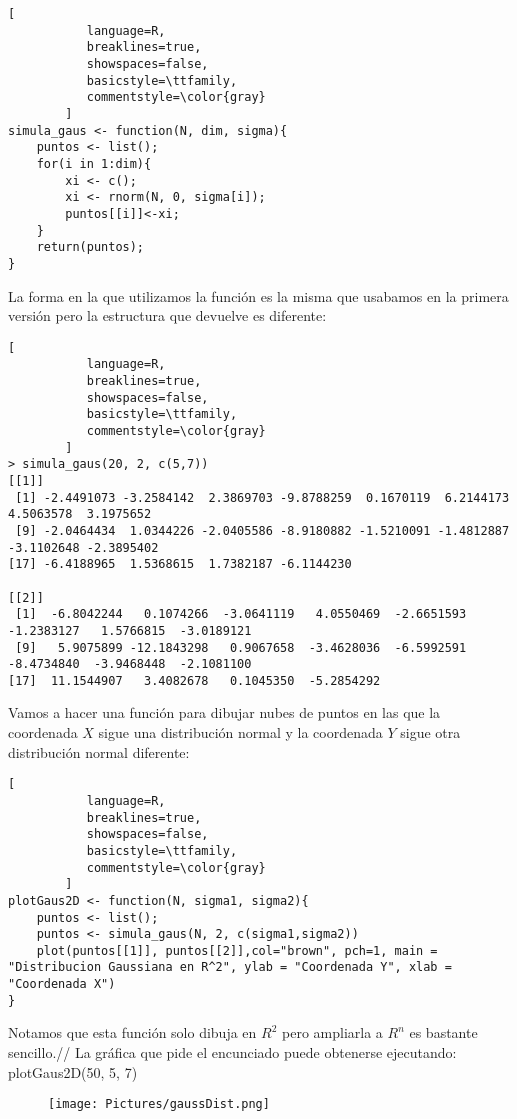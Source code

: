 \documentclass[11pt,fleqn]{book} %
\begin{document}
\begin{lstlisting}[
           language=R,
           breaklines=true,
           showspaces=false,
           basicstyle=\ttfamily,
           commentstyle=\color{gray}
        ]
simula_gaus <- function(N, dim, sigma){
    puntos <- list();
    for(i in 1:dim){
        xi <- c();
        xi <- rnorm(N, 0, sigma[i]);
        puntos[[i]]<-xi;
    }
    return(puntos);
}
\end{lstlisting}
La forma en la que utilizamos la función es la misma que usabamos en la primera versión pero la estructura que devuelve es diferente:
\begin{lstlisting}[
           language=R,
           breaklines=true,
           showspaces=false,
           basicstyle=\ttfamily,
           commentstyle=\color{gray}
        ]
> simula_gaus(20, 2, c(5,7))
[[1]]
 [1] -2.4491073 -3.2584142  2.3869703 -9.8788259  0.1670119  6.2144173  4.5063578  3.1975652
 [9] -2.0464434  1.0344226 -2.0405586 -8.9180882 -1.5210091 -1.4812887 -3.1102648 -2.3895402
[17] -6.4188965  1.5368615  1.7382187 -6.1144230

[[2]]
 [1]  -6.8042244   0.1074266  -3.0641119   4.0550469  -2.6651593  -1.2383127   1.5766815  -3.0189121
 [9]   5.9075899 -12.1843298   0.9067658  -3.4628036  -6.5992591  -8.4734840  -3.9468448  -2.1081100
[17]  11.1544907   3.4082678   0.1045350  -5.2854292
\end{lstlisting}
Vamos a hacer una función para dibujar nubes de puntos en las que la coordenada $X$ sigue una distribución normal y la coordenada $Y$ sigue otra distribución normal diferente:
\begin{lstlisting}[
           language=R,
           breaklines=true,
           showspaces=false,
           basicstyle=\ttfamily,
           commentstyle=\color{gray}
        ]
plotGaus2D <- function(N, sigma1, sigma2){
    puntos <- list();
    puntos <- simula_gaus(N, 2, c(sigma1,sigma2))
    plot(puntos[[1]], puntos[[2]],col="brown", pch=1, main = "Distribucion Gaussiana en R^2", ylab = "Coordenada Y", xlab = "Coordenada X")
}
\end{lstlisting}
Notamos que esta función solo dibuja en $R^2$ pero ampliarla a $R^n$ es bastante sencillo.//
La gráfica que pide el encunciado puede obtenerse ejecutando: plotGaus2D(50, 5, 7)
\begin{figure}[h]
\texttt{[image: Pictures/gaussDist.png]}
\end{figure}
\end{document}
